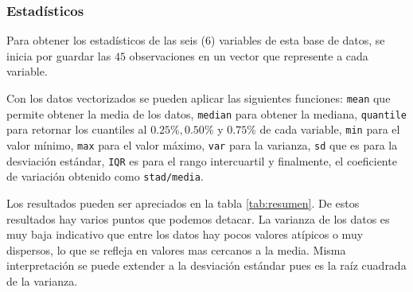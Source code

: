 \documentclass{staprojteamusb}
\begin{document}
 \hypertarget{estaduxedsticos}{%
 \subsubsection{Estadísticos}\label{estaduxedsticos}}

 Para obtener los estadísticos de las seis (6) variables de esta base de datos, se inicia por guardar las \(45\) observaciones en un vector que represente a cada variable.

 Con los datos vectorizados se pueden aplicar las siguientes funciones: \texttt{mean} que permite obtener la media de los datos, \texttt{median} para obtener la mediana, \texttt{quantile} para retornar los cuantiles al \(0.25\%, 0.50\%\) y \(0.75\%\) de cada variable, \texttt{min} para el valor mínimo, \texttt{max} para el valor máximo, \texttt{var} para la varianza, \texttt{sd} que es para la desviación estándar, \texttt{IQR} es para el rango intercuartil y finalmente, el coeficiente de variación obtenido como \texttt{stad/media}.

 \begin{table}

 \caption{\label{tab:resumen}Resumen Estadístico de las variables}
 \centering
 \end{table}

 Los resultados pueden ser apreciados en la tabla \ref{tab:resumen}. De estos resultados hay varios puntos que podemos detacar. La varianza de los datos es muy baja indicativo que entre los datos hay pocos valores atípicos o muy dispersos, lo que se refleja en valores mas cercanos a la media. Misma interpretación se puede extender a la desviación estándar pues es la raíz cuadrada de la varianza.
\end{document}

